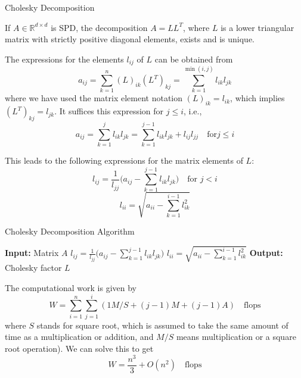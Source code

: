 \documentclass[8pt]{beamer}
\begin{document}
\begin{frame}{Cholesky Decomposition}
\begin{theorem}
If $A \in \mathbb{R}^{d \times d}$ is SPD, the decomposition $A = LL^{T}$, where $L$ is a lower triangular matrix with strictly positive diagonal elements, exists and is unique. 
\end{theorem}


The expressions for the elements $l_{ij}$ of $L$ can be obtained from
\begin{equation*}
a_{ij} = \sum_{k = 1}^{n} (L)_{ik}(L^{T})_{kj} = \sum_{k=1}^{\min(i,j)}l_{ik}l_{jk}
\end{equation*}
where we have used the matrix element notation $(L)_{ik} = l_{ik}$, which implies $(L^T)_{kj} = l_{jk}$. It suffices this expression for $j \leq i$, i.e., 
\begin{equation*}
a_{ij} = \sum_{k = 1}^{j}l_{ik}l_{jk} = \sum_{k=1}^{j-1}l_{ik}l_{jk} + l_{ij}l_{jj} \quad \text{for} j \leq i
\end{equation*}

\vspace{2mm}

This leads to the following expressions for the matrix elements of $L$:
\begin{equation*}
l_{ij} = \frac{1}{l_{jj}} \biggl(a_{ij} - \sum_{k=1}^{j-1} l_{ik}l_{jk}\biggr) \quad  \text{for $j < i$}
\end{equation*}
\begin{equation*}
l_{ii} = \sqrt{a_{ii} - \sum_{k=1}^{i-1}l_{ik}^{2}}
\end{equation*}
\end{frame}

\begin{frame}{Cholesky Decomposition Algorithm}
\begin{algorithm}[H]
\caption{Cholesky Decomposition}\label{alg:cholesky-decomposition}
\begin{algorithmic}[1]
  \State \textbf{Input:} Matrix $A$
      \State $l_{ij} = \frac{1}{l_{jj}} \biggl(a_{ij} - \sum_{k=1}^{j-1} l_{ik}l_{jk}\biggr)$
    \EndFor
    \State $l_{ii} = \sqrt{a_{ii} - \sum_{k=1}^{i-1}l_{ik}^{2}}$
  \EndFor
  \State \textbf{Output:} Cholesky factor $L$
\end{algorithmic}
\end{algorithm}

The computational work is given by 
$$W = \sum_{i=1}^{n}\sum_{j=1}^{i}(1 M/S + (j-1)M + (j-1)A) \quad \text{flops}$$
where $S$ stands for square root, which is assumed to take the same amount of time as a multiplication or addition, and $M/S$ means multiplication or a square root operation). We can solve this to get
$$W = \frac{n^3}{3}+O(n^2) \quad \text{flops}$$
\end{frame}
\end{document}
